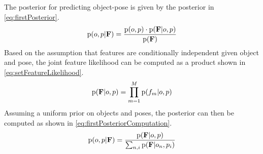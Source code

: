         The posterior for predicting object-pose is given by the posterior in \eqref{eq:firstPosterior}.
        \begin{equation}
            \label{eq:firstPosterior}
            \prob{o,p|\set{F}} = \frac{\prob{o,p} \cdot \prob{\set{F}|o,p}}{\prob{\set{F}}}
        \end{equation}
        Based on the assumption that features are conditionally independent given object and pose, the joint feature likelihood can be computed as a product shown in \eqref{eq:setFeatureLikelihood}.
        \begin{equation}
            \label{eq:setFeatureLikelihood}
            \prob{\set{F}|o,p} = \prod_{m=1}^{M} \prob{f_m|o,p}
        \end{equation}
        Assuming a uniform prior on objects and poses, the posterior can then be computed as shown in \eqref{eq:firstPosteriorComputation}.
        \begin{equation}
            \label{eq:firstPosteriorComputation}
            \prob{o,p|\set{F}} = \frac{\prob{\set{F}|o,p}}{\sum_{n,i} \prob{\set{F}|o_n,p_i}}
        \end{equation}
